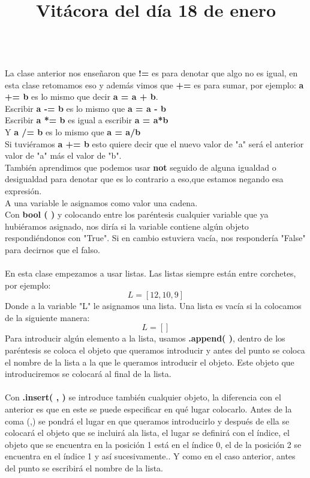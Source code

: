 \documentclass{article}
\begin{document}
	\title{\huge\textbf{Vitácora del día 18 de enero\\}} \\
	La clase anterior nos enseñaron que \textbf{!=} es para denotar que algo no es igual, en esta clase retomamos eso y además vimos que \textbf{+=} es para sumar, por ejemplo: \textbf{a += b} es lo mismo que decir \textbf{a = a + b}. \\
	Escribir \textbf{a -= b} es lo mismo que \textbf{a = a - b} \\
	Escribir \textbf{a *= b} es igual a escribir \textbf{a = a*b} \\
	Y \textbf{a /= b } es lo mismo que \textbf{a = a/b} \\
	Si tuviéramos \textbf{a += b} esto quiere decir que el nuevo valor de "a" será el anterior valor de "a" más el valor de "b".\\
	También aprendimos que podemos usar \textbf{not} seguido de alguna igualdad o desigualdad para denotar que es lo contrario a eso,que estamos negando esa expresión. \\
	A una variable le asignamos como valor una cadena. \\
	Con \textbf{bool ( )} y colocando entre los paréntesis cualquier variable que ya hubiéramos asignado, nos diría si la variable contiene algún objeto respondiéndonos con "True". Si en cambio estuviera vacía, nos respondería "False" para decirnos que el falso. \\ \\
	En esta clase empezamos a usar listas. Las listas siempre están entre corchetes, por ejemplo: \[ L = [12, 10, 9]  \]
	Donde a la variable "L" le asignamos una lista. Una lista es vacía si la colocamos de la siguiente manera:  \[ L = []  \]
	Para introducir algún elemento a la lista, usamos \textbf{.append( )}, dentro de los paréntesis se coloca el objeto que queramos introducir y antes del punto se coloca el nombre de la lista a la que le queramos introducir el objeto. Este objeto que introduciremos se colocará al final de la lista. \\ \\
	Con \textbf{.insert( , )} se introduce también cualquier objeto, la diferencia con el anterior es que en este se puede especificar en qué lugar colocarlo. Antes de la coma (,) se pondrá el lugar en que queramos introducirlo y después de ella se colocará el objeto que se incluirá ala lista, el lugar se definirá con el índice, el objeto que se encuentra en la posición 1 está en el índice 0, el de la posición 2 se encuentra en el índice 1 y así sucesivamente.. Y como en el caso anterior, antes del punto se escribirá el nombre de la lista. \\ \\
\end{document}
